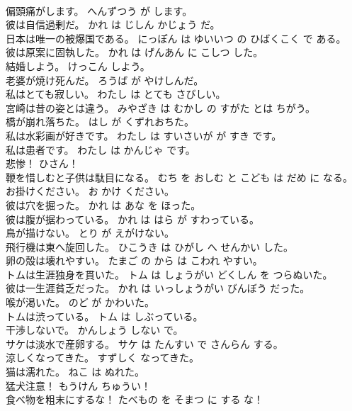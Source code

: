 \documentclass[8pt]{extreport}
\begin{document}
\begin{CJK}{UTF8}{min}
\\	偏頭痛がします。	へんずつう が します。	
\\	彼は自信過剰だ。	かれ は じしん かじょう だ。	
\\	日本は唯一の被爆国である。	にっぽん は ゆいいつ の ひばくこく で ある。	
\\	彼は原案に固執した。	かれ は げんあん に こしつ した。	
\\	結婚しよう。	けっこん しよう。	
\\	老婆が焼け死んだ。	ろうば が やけしんだ。	
\\	私はとても寂しい。	わたし は とても さびしい。	
\\	宮崎は昔の姿とは違う。	みやざき は むかし の すがた とは ちがう。	
\\	橋が崩れ落ちた。	はし が くずれおちた。	
\\	私は水彩画が好きです。	わたし は すいさいが が すき です。	
\\	私は患者です。	わたし は かんじゃ です。	
\\	悲惨！	ひさん！	
\\	鞭を惜しむと子供は駄目になる。	むち を おしむ と こども は だめ に なる。	
\\	お掛けください。	お かけ ください。	
\\	彼は穴を掘った。	かれ は あな を ほった。	
\\	彼は腹が据わっている。	かれ は はら が すわっている。	
\\	鳥が描けない。	とり が えがけない。	
\\	飛行機は東へ旋回した。	ひこうき は ひがし へ せんかい した。	
\\	卵の殻は壊れやすい。	たまご の から は こわれ やすい。	
\\	トムは生涯独身を貫いた。	トム は しょうがい どくしん を つらぬいた。	
\\	彼は一生涯貧乏だった。	かれ は いっしょうがい びんぼう だった。	
\\	喉が渇いた。	のど が かわいた。	
\\	トムは渋っている。	トム は しぶっている。	
\\	干渉しないで。	かんしょう しない で。	
\\	サケは淡水で産卵する。	サケ は たんすい で さんらん する。	
\\	涼しくなってきた。	すずしく なってきた。	
\\	猫は濡れた。	ねこ は ぬれた。	
\\	猛犬注意！	もうけん ちゅうい！	
\\	食べ物を粗末にするな！	たべもの を そまつ に する な！	

\end{CJK}
\end{document}
